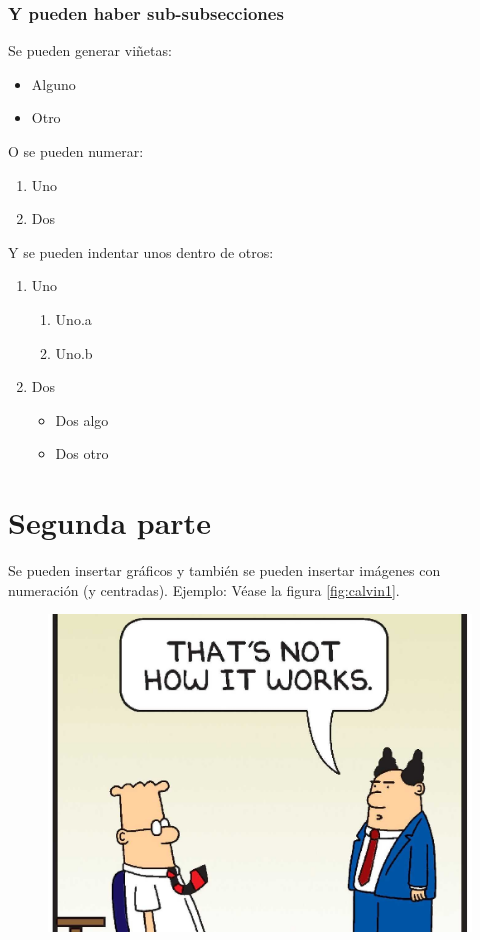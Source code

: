 \documentclass[journal]{IEEEtran}
\begin{document}
\subsubsection{Y pueden haber sub-subsecciones}
Se pueden generar viñetas:
\begin{itemize}
    \item Alguno
    \item Otro
\end{itemize}
O se pueden numerar:
\begin{enumerate}
    \item Uno
    \item Dos
\end{enumerate}
Y se pueden indentar unos dentro de otros:
\begin{enumerate}
    \item Uno
    \begin{enumerate}
        \item Uno.a
        \item Uno.b
    \end{enumerate}
    \item Dos
    \begin{itemize}
        \item Dos algo
        \item Dos otro
    \end{itemize}
\end{enumerate}
\section{Segunda parte}
Se pueden insertar gráficos y también se  pueden insertar imágenes con numeración (y centradas). Ejemplo: Véase la figura \ref{fig:calvin1}.
\begin{figure}
\includegraphics[scale = 0.1]{Imagenes/Dilbert.jpg}
\end{figure}
\end{document}
